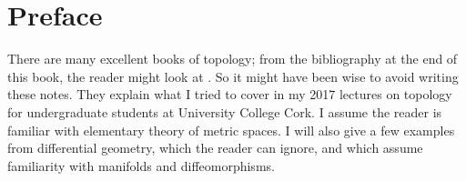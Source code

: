 

\vrefwarning
%
\chapter*{Preface}
There are many excellent books of topology; from the bibliography at the end of this book, the reader might look at \cite{MR705632,MR1700700,MR1867354,MR2483686,MR734483,MR2218695,Milnor:1997,MR3728284,MR2313004,MR2233951,MR2155623,MR1679607,MR1384994,MR2456045}.
So it might have been wise to avoid writing these notes. 
They explain what I tried to cover in my 2017 lectures on topology for undergraduate students at University College Cork.
I assume the reader is familiar with elementary theory of metric spaces.
I will also give a few examples from differential geometry, which the reader can ignore, and which assume familiarity with manifolds and diffeomorphisms.
\afterpreface 






